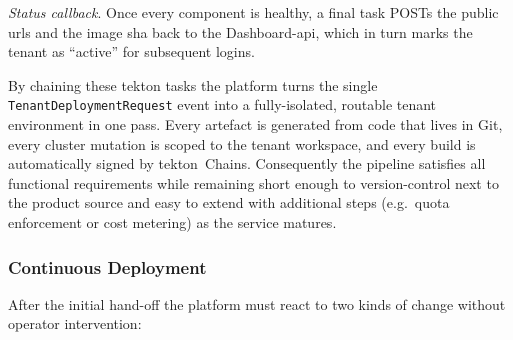 \documentclass[11pt, a4paper, oneside, listof=totoc]{scrartcl}
\begin{document}
\begin{enumerate}[label={[\arabic*]:},
                    ref=Challenge~\arabic*,
                    leftmargin=*,
                    itemsep=0.6\baselineskip]
                    \item\label{chal:callback}
                        \textit{Status callback}.  
                        Once every component is healthy, a final task POSTs the public \glspl{url}
                        and the image \gls{sha} back to the Dashboard-\gls{api}, which in turn marks
                        the tenant as \enquote{active} for subsequent logins.
                \end{enumerate}

                By chaining these \gls{tekton} tasks the platform turns the single
                \texttt{TenantDeploymentRequest} event into a fully-isolated, routable tenant
                environment in one pass.
                Every artefact is generated from code that lives in Git, every cluster mutation is
                scoped to the tenant workspace, and every build is automatically signed by
                \gls{tekton}~Chains.
                Consequently the pipeline satisfies all functional requirements while
                remaining short enough to version-control next to the product source and easy to
                extend with additional steps (e.g.\ quota enforcement or cost metering) as the
                service matures.

            \FloatBarrier
            \subsubsection{Continuous Deployment}\label{subsubsec:continuousDeployment}
                After the initial hand-off the platform must react to two kinds of change without
                operator intervention:
\end{document}
